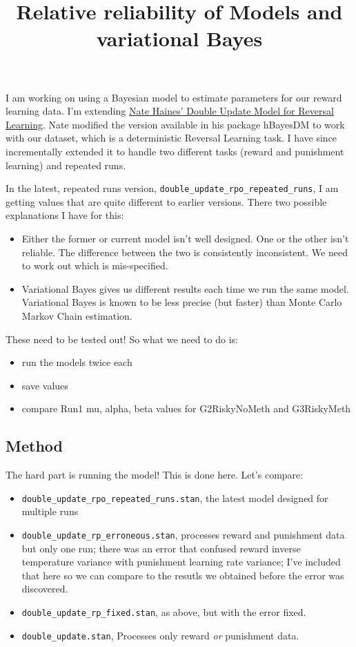 \documentclass[]{article}
\title{Relative reliability of Models and variational Bayes}
\author{}
\date{}
\providecommand{\tightlist}{%
  \setlength{\itemsep}{0pt}\setlength{\parskip}{0pt}}
\begin{document}
\maketitle

I am working on using a Bayesian model to estimate parameters for our
reward learning data. I'm extending
\href{https://rpubs.com/CCSL/hBayesDM}{Nate Haines' Double Update Model
for Reversal Learning}. Nate modified the version available in his
package hBayesDM to work with our dataset, which is a deterministic
Reversal Learning task. I have since incrementally extended it to handle
two different tasks (reward and punishment learning) and repeated runs.

In the latest, repeated runs version,
\texttt{double\_update\_rpo\_repeated\_runs}, I am getting values that
are quite different to earlier versions. There two possible explanations
I have for this:

\begin{itemize}
\tightlist
\item
  Either the former or current model isn't well designed. One or the
  other isn't reliable. The difference between the two is consistently
  inconsistent. We need to work out which is mis-specified.
\item
  Variational Bayes gives us different results each time we run the same
  model. Variational Bayes is known to be less precise (but faster) than
  Monte Carlo Markov Chain estimation.
\end{itemize}

These need to be tested out! So what we need to do is:

\begin{itemize}
\tightlist
\item
  run the models twice each
\item
  save values
\item
  compare Run1 mu, alpha, beta values for G2RiskyNoMeth and G3RiskyMeth
\end{itemize}

\subsection{Method}\label{method}

The hard part is running the model! This is done here. Let's compare:

\begin{itemize}
\tightlist
\item
  \texttt{double\_update\_rpo\_repeated\_runs.stan}, the latest model
  designed for multiple runs
\item
  \texttt{double\_update\_rp\_erroneous.stan}, processes reward and
  punishment data but only one run; there was an error that confused
  reward inverse temperature variance with punishment learning rate
  variance; I've included that here so we can compare to the resutls we
  obtained before the error was discovered.
\item
  \texttt{double\_update\_rp\_fixed.stan}, as above, but with the error
  fixed.
\item
  \texttt{double\_update.stan}, Processes only reward \emph{or}
  punishment data.
\end{itemize}
\end{document}
